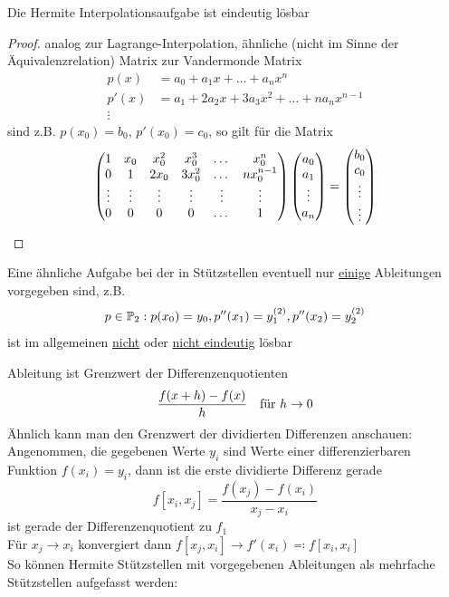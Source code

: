 \documentclass[../Skript.tex]{subfiles}
\begin{document}
\begin{theorem}
    Die Hermite Interpolationsaufgabe ist eindeutig lösbar
\end{theorem}
\begin{proof}
    analog zur Lagrange-Interpolation, ähnliche (nicht im Sinne der Äquivalenzrelation) Matrix zur Vandermonde Matrix
    \begin{align*}
        p(x) &= a_0 + a_1x + \dots + a_nx^n\\
        p'(x) &= a_1+2a_2x+3a_3x^2+\dots+na_nx^{n-1}\\
        \vdots
    \end{align*}
    sind z.B. $p(x_0) = b_0$, $p'(x_0)=c_0$, so gilt für die Matrix \[
        \begin{pmatrix}
            1&x_0&x_0^2&x_0^3&\dots&x_0^n \\
            0&1&2x_0&3x_0^2&\dots&nx_0^{n-1}\\
            \vdots&\vdots&\vdots&\vdots & \vdots&\vdots\\
            0&0&0&0&\dots& 1
        \end{pmatrix}\begin{pmatrix}
        a_0\\a_1\\ \vdots\\a_n
        \end{pmatrix}
        = \begin{pmatrix}b_0\\c_0\\\vdots\\\vdots\end{pmatrix}
    \]
\end{proof}
\begin{remark}
    Eine ähnliche Aufgabe bei der in Stützstellen eventuell nur \underline{einige} Ableitungen vorgegeben sind, z.B. \[
    p\in\mathbb{P}_2: p(x_0) = y_0, p''(x_1) = y_1^{(2)}, p''(x_2)=y_2^{(2)}
    \] 
    ist im allgemeinen \underline{nicht} oder \underline{nicht eindeutig} lösbar
\end{remark}
 Ableitung ist Grenzwert der Differenzenquotienten \[
    \frac{f(x+h) - f(x)}{h} \hspace{1em} \text{für }h\to 0
 \]
Ähnlich kann man den Grenzwert der dividierten Differenzen anschauen:\\
Angenommen, die gegebenen Werte $y_i$ sind Werte einer differenzierbaren Funktion $f(x_i) = y_i$, dann ist die erste 
dividierte Differenz gerade \[
    f[x_i, x_j] = \frac{f(x_j) - f(x_i)}{x_j-x_i} 
\]
ist gerade der Differenzenquotient zu $f_1$\\
Für $x_j\to x_i$ konvergiert dann $f[x_j,x_i]\to f'(x_i)\eqqcolon f[x_i,x_i]$\\
So können Hermite Stützstellen mit vorgegebenen Ableitungen als mehrfache Stützstellen aufgefasst werden:\\
\end{document}
